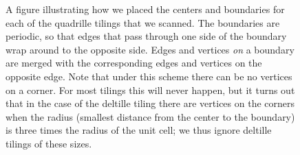\documentclass[12pt]{amsbook}
\theoremstyle{plain}
\theoremstyle{definition}
\theoremstyle{remark}
\begin{document}
\begin{figure}
\caption{
\label{figure:boundaries1}
A figure illustrating how we placed the centers and boundaries for each of the quadrille tilings that we scanned.  The boundaries are periodic, so that edges that pass through one side of the boundary wrap around to the opposite side.  Edges and vertices \emph{on} a boundary are merged with the corresponding edges and vertices on the opposite edge.
Note that under this scheme there can be no vertices on a corner.  For most tilings this will never happen, but it turns out that in the case of the deltille tiling there are vertices on the corners when the radius (smallest distance from the center to the boundary) is three times the radius of the unit cell;  we thus ignore deltille tilings of these sizes.
}
\end{figure}

\begin{figure}
\centering
{}
\\

\end{figure}
\end{document}
